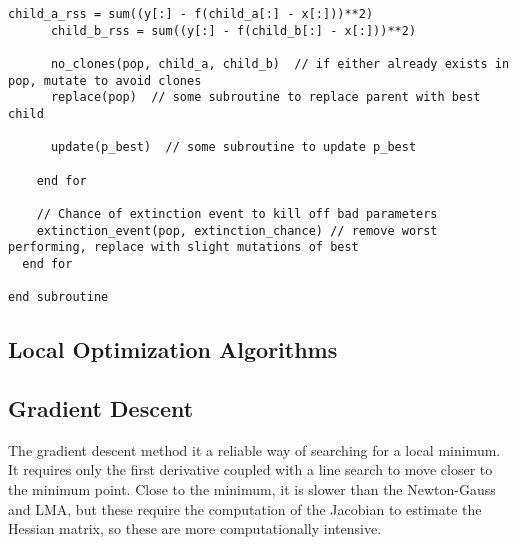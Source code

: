 \begin{lstlisting}[style=sPseudo,caption={Simple simulated annealing subroutine}]
      child_a_rss = sum((y[:] - f(child_a[:] - x[:]))**2) 
      child_b_rss = sum((y[:] - f(child_b[:] - x[:]))**2) 
      
      no_clones(pop, child_a, child_b)  // if either already exists in pop, mutate to avoid clones
      replace(pop)  // some subroutine to replace parent with best child
      
      update(p_best)  // some subroutine to update p_best
      
    end for
    
    // Chance of extinction event to kill off bad parameters
    extinction_event(pop, extinction_chance) // remove worst performing, replace with slight mutations of best
  end for
  
end subroutine
\end{lstlisting}





\subsection{Local Optimization Algorithms}


\subsection{Gradient Descent}

The gradient descent method it a reliable way of searching for a local minimum.  It requires only the first derivative coupled with a line search to move closer to the minimum point.  Close to the minimum, it is slower than the Newton-Gauss and LMA, but these require the computation of the Jacobian to estimate the Hessian matrix, so these are more computationally intensive.


